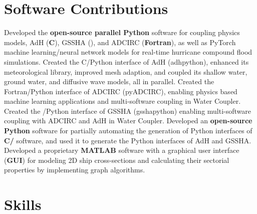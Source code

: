 \documentclass[letterpaper,10pt]{article}
\begin{document}
\section{Software Contributions}
  \resumeSubItemListStart
      {Developed the \textbf{open-source parallel Python} software for coupling
      physics models, AdH (\textbf{C}), GSSHA (\textbf{\CC{}}), and ADCIRC
      (\textbf{Fortran}), as well as PyTorch machine learning/neural network
      models for real-time hurricane compound flood simulations.}
      {Created the C/Python interface of AdH (adhpython), enhanced its meteorological library,
      improved mesh adaption, and coupled its shallow water, ground
      water, and diffusive wave models, all in parallel.}
      {Created the Fortran/Python interface of ADCIRC (pyADCIRC), enabling physics
      based machine learning applications and multi-software coupling in Water
      Coupler.}
      {Created the \CC{}/Python interface of GSSHA (gsshapython) enabling
      multi-software coupling with ADCIRC and AdH in Water Coupler.}
      {Developed an \textbf{open-source Python} software for partially
      automating the generation of Python interfaces of \textbf{C/\CC{}}
      software, and used it to generate the Python interfaces of AdH and GSSHA.}
      {Developed a proprietary \textbf{MATLAB} software with a graphical user
      interface (\textbf{GUI}) for modeling 2D ship cross-sections and
      calculating their sectorial properties by implementing graph algorithms.}
  \resumeSubItemListEnd
\vspace{-5pt}

\section{Skills}
  \resumeSubHeadingListStart

      \resumeItemListStart
\end{document}

